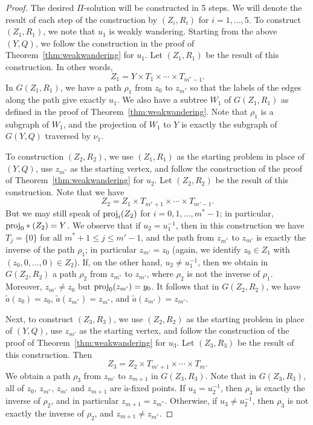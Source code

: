 \documentclass[10pt,a4paper]{amsart}
\theoremstyle{definition}
\theoremstyle{definition}
\numberwithin{equation}{section}
\begin{document}
\begin{proof}
The desired $\Pi$-solution will be constructed in 5 steps. We will denote the result of each step of the construction by $(Z_i, R_i)$ for $i=1,\dots, 5$. To construct $(Z_1, R_1)$, we note that $u_1$ is weakly wandering. Starting from the above $(Y, Q)$, we follow the construction in the proof of Theorem~\ref{thm:weakwandering} for $u_1$. Let $(Z_1, R_1)$ be the result of this construction. In other words, 
$$ Z_1=Y\times T_1\times\cdots \times T_{m^*-1}. $$
In $G(Z_1, R_1)$, we have a path $\rho_1$ from $z_0$ to $z_{m^*}$ so that the labels of the edges along the path give exactly $u_1$. We also have a subtree $W_1$ of $G(Z_1, R_1)$ as defined in the proof of Theorem~\ref{thm:weakwandering}. Note that $\rho_1$ is a subgraph of $W_1$, and the projection of $W_1$ to $Y$ is exactly the subgraph of $G(Y,Q)$ traversed by $\nu_1$. 

To construction $(Z_2, R_2)$, we use $(Z_1, R_1)$ as the starting problem in place of $(Y, Q)$, use $z_{m^*}$ as the starting vertex, and follow the construction of the proof of Theorem~\ref{thm:weakwandering} for $u_2$. Let $(Z_2, R_2)$ be the result of this construction. Note that we have
$$ Z_2=Z_1\times T_{m^*+1}\times \cdots \times T_{m'-1}. $$
But we may still speak of $\mbox{\rm proj}_i(Z_2)$ for $i=0,1,\dots, m^*-1$; in particular, $\mbox{\rm proj}_0*(Z_2)=Y$. We observe that if $u_2=u_1^{-1}$, then in this construction we have $T_j=\{0\}$ for all $m^*+1\leq j\leq m'-1$, and the path from $z_{m^*}$ to $z_{m'}$ is exactly the inverse of the path $\rho_1$; in particular $z_{m'}=z_0$ (again, we identify $z_0\in Z_1$ with $(z_0, 0, \dots, 0)\in Z_2$). If, on the other hand, $u_2\neq u_1^{-1}$, then we obtain in $G(Z_2, R_2)$ a path $\rho_2$ from $z_{m^*}$ to $z_{m'}$, where $\rho_2$ is not the inverse of $\rho_1$. Moreover, $z_{m'}\neq z_0$ but $\mbox{\rm proj}_0(z_{m'})=y_0$. It follows that in $G(Z_2, R_2)$, we have $\tilde{a}(z_0)=z_0$, $\tilde{a}(z_{m^*})=z_{m^*}$, and $\tilde{a}(z_{m'})=z_{m'}$.

Next, to construct $(Z_3, R_3)$, we use $(Z_2, R_2)$ as the starting problem in place of $(Y, Q)$, use $z_{m'}$ as the starting vertex, and follow the construction of the proof of Theorem~\ref{thm:weakwandering} for $u_3$. Let $(Z_3, R_3)$ be the result of this construction. Then 
$$ Z_3=Z_2\times T_{m'+1}\times\cdots\times T_{m}. $$
We obtain a path $\rho_3$ from $z_{m'}$ to $z_{m+1}$ in $G(Z_3, R_3)$. Note that in $G(Z_3, R_3)$, all of $z_0$, $z_{m^*}$, $z_{m'}$ and $z_{m+1}$ are $\tilde{a}$-fixed points. If $u_3=u_2^{-1}$, then $\rho_3$ is exactly the inverse of $\rho_2$, and in particular $z_{m+1}=z_{m^*}$. Otherwise, if $u_3\neq u_2^{-1}$, then $\rho_3$ is not exactly the inverse of $\rho_2$, and $z_{m+1}\neq z_{m^*}$.


\end{proof}
\end{document}
